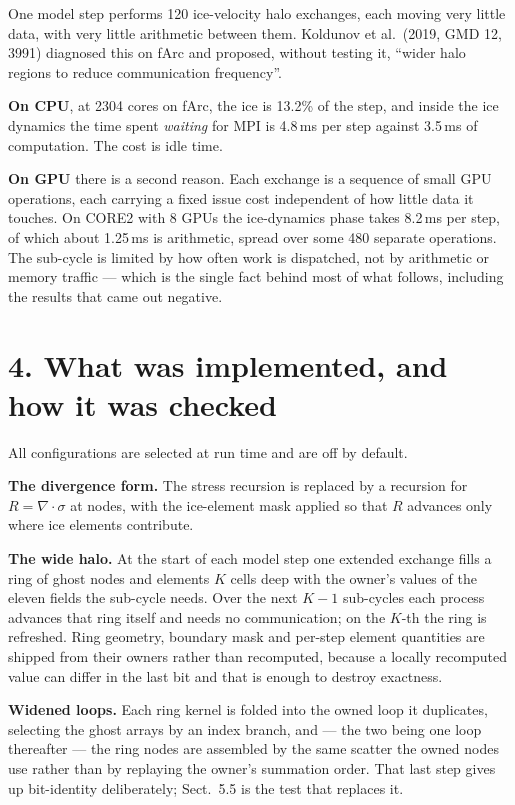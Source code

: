 \documentclass[11pt,a4paper]{article}
\begin{document}
One model step performs 120 ice-velocity halo exchanges, each moving very little data, with very
little arithmetic between them. Koldunov et al.\ (2019, GMD 12, 3991) diagnosed this on fArc and
proposed, without testing it, ``wider halo regions to reduce communication frequency''.

\textbf{On CPU}, at 2304 cores on fArc, the ice is 13.2\% of the step, and inside the ice dynamics
the time spent \emph{waiting} for MPI is 4.8\,ms per step against 3.5\,ms of computation. The cost
is idle time.

\textbf{On GPU} there is a second reason. Each exchange is a sequence of small GPU operations, each
carrying a fixed issue cost independent of how little data it touches. On CORE2 with 8 GPUs the
ice-dynamics phase takes 8.2\,ms per step, of which about 1.25\,ms is arithmetic, spread over some
480 separate operations. The sub-cycle is limited by how often work is dispatched, not by
arithmetic or memory traffic --- which is the single fact behind most of what follows, including
the results that came out negative.

\section*{4. What was implemented, and how it was checked}

All configurations are selected at run time and are off by default.

\textbf{The divergence form.} The stress recursion is replaced by a recursion for
$R=\nabla\!\cdot\!\sigma$ at nodes, with the ice-element mask applied so that $R$ advances only
where ice elements contribute.

\textbf{The wide halo.} At the start of each model step one extended exchange fills a ring of ghost
nodes and elements $K$ cells deep with the owner's values of the eleven fields the sub-cycle needs.
Over the next $K-1$ sub-cycles each process advances that ring itself and needs no communication;
on the $K$-th the ring is refreshed. Ring geometry, boundary mask and per-step element quantities
are shipped from their owners rather than recomputed, because a locally recomputed value can differ
in the last bit and that is enough to destroy exactness.

\textbf{Widened loops.} Each ring kernel is folded into the owned loop it duplicates, selecting the
ghost arrays by an index branch, and --- the two being one loop thereafter --- the ring nodes are
assembled by the same scatter the owned nodes use rather than by replaying the owner's summation
order. That last step gives up bit-identity deliberately; Sect.~5.5 is the test that replaces it.
\end{document}
